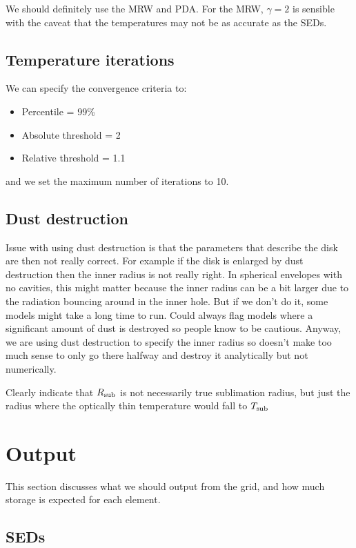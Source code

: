 \documentclass[10pt]{article}
\begin{document}
We should definitely use the MRW and PDA. For the MRW, $\gamma=2$ is sensible with the caveat that the temperatures may not be as accurate as the SEDs.

\subsection{Temperature iterations}

We can specify the convergence criteria to:

\begin{itemize}
\item Percentile = 99\%
\item Absolute threshold = 2
\item Relative threshold = 1.1
\end{itemize}

and we set the maximum number of iterations to 10.

\subsection{Dust destruction}

Issue with using dust destruction is that the parameters that describe the disk are then not really correct. For example if the disk is enlarged by dust destruction then the inner radius is not really right. In spherical envelopes with no cavities, this might matter because the inner radius can be a bit larger due to the radiation bouncing around in the inner hole. But if we don't do it, some models might take a long time to run. Could always flag models where a significant amount of dust is destroyed so people know to be cautious. Anyway, we are using dust destruction to specify the inner radius so doesn't make too much sense to only go there halfway and destroy it analytically but not numerically.

Clearly indicate that $R_{\rm sub}$ is not necessarily true sublimation radius, but just the radius where the optically thin temperature would fall to $T_{\rm sub}$

\section{Output}

This section discusses what we should output from the grid, and how much storage is expected for each element.

\subsection{SEDs}
\end{document}
